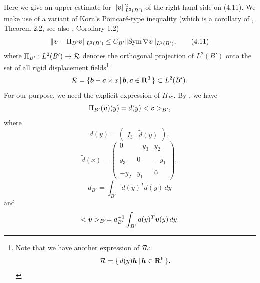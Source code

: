Here we give an upper estimate for $\Vert \mbox{\boldmath $v$}\Vert_{L^2(B')}^2$ of the right-hand side on (4.11).
We make use of  a variant of Korn's Poincar\'e-type inequality (which is a corollary of \cite{N}, Theorem 2.2, see also \cite{BP}, Corollary 1.2)
$$\displaystyle
\Vert\mbox{\boldmath $v$}-\Pi_{B'}\mbox{\boldmath $v$}\Vert_{L^2(B')}
\le C_{B'}\Vert\text{Sym}\,\nabla\mbox{\boldmath $v$}\Vert_{L^2(B')},
\tag {4.11}
$$
where $\Pi_{B'}:L^2(B')\rightarrow {\cal R}$ denotes the orthogonal projection of $L^2(B')$ onto 
the set of all rigid displacement fields\footnote{Note that we have another expression of ${\cal R}$:
$$\displaystyle
{\cal R}=\{\,d(y)\mbox{\boldmath $h$}\,\vert\, \mbox{\boldmath $h$}\in\Bbb R^6\,\}.
$$
}
$$\displaystyle
{\cal R}=\{\mbox{\boldmath $b$}+\mbox{\boldmath $c$}\times x\,\vert\, \mbox{\boldmath $b$}, \mbox{\boldmath $c$}\in\Bbb R^3\,\}\subset L^2(B').
$$
For our purpose, we need the explicit expression of $\Pi_{B'}$.  By \cite{BP}, 
we have
$$\displaystyle
\Pi_{B'}(\mbox{\boldmath $v$})(y)
=d(y)<\mbox{\boldmath $v$}>_{B'},
$$
where
$$\displaystyle
d(y)=\left(
\begin{array}{cc}
\displaystyle
I_3 
&
\displaystyle
\tilde{d}(y)
\end{array}
\right),
$$
$$\displaystyle
\tilde{d}(x)
=
\left(
\begin{array}{ccc}
\displaystyle
0
&
\displaystyle
-y_3
&
\displaystyle
y_2
\\
\\
\displaystyle
y_3
&
\displaystyle
0
&
\displaystyle
-y_1
\\
\\
\displaystyle
-y_2
&
\displaystyle
y_1
&
\displaystyle
0
\end{array}
\right),
$$
$$\displaystyle
d_{B'}=\int_{B'}d(y)^Td(y)\,dy
$$
and
$$\displaystyle
<\mbox{\boldmath $v$}>_{B'}
=d_{B'}^{-1}\int_{B'}d(y)^T\mbox{\boldmath $v$}(y)\,dy.
$$







